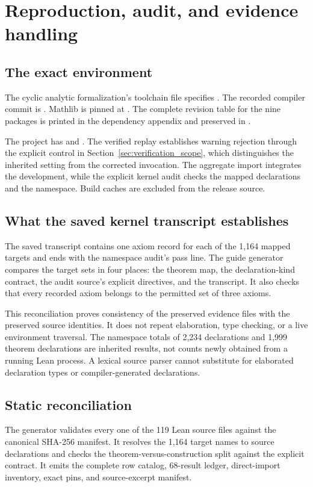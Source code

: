 \section{Reproduction, audit, and evidence handling}
\subsection{The exact environment}
The cyclic analytic formalization's toolchain file specifies . The recorded compiler commit is . Mathlib is pinned at . The complete revision table for the nine packages is printed in the dependency appendix and preserved in .

The project has  and . The verified replay establishes warning rejection through the explicit control in Section~\ref{sec:verification_scope}, which distinguishes the inherited setting from the corrected invocation. The aggregate import integrates the development, while the explicit kernel audit checks the mapped declarations and the namespace. Build caches are excluded from the release source.

\subsection{What the saved kernel transcript establishes}
The saved transcript contains one axiom record for each of the 1,164 mapped targets and ends with the namespace audit's pass line. The guide generator compares the target sets in four places: the theorem map, the declaration-kind contract, the audit source's explicit directives, and the transcript. It also checks that every recorded axiom belongs to the permitted set of three axioms.

This reconciliation proves consistency of the preserved evidence files with the preserved source identities. It does not repeat elaboration, type checking, or a live environment traversal. The namespace totals of 2,234 declarations and 1,999 theorem declarations are inherited results, not counts newly obtained from a running Lean process. A lexical source parser cannot substitute for elaborated declaration types or compiler-generated declarations.

\subsection{Static reconciliation}
The generator validates every one of the 119 Lean source files against the canonical SHA-256 manifest. It resolves the 1,164 target names to source declarations and checks the theorem-versus-construction split against the explicit contract. It emits the complete row catalog, 68-result ledger, direct-import inventory, exact pins, and source-excerpt manifest.

